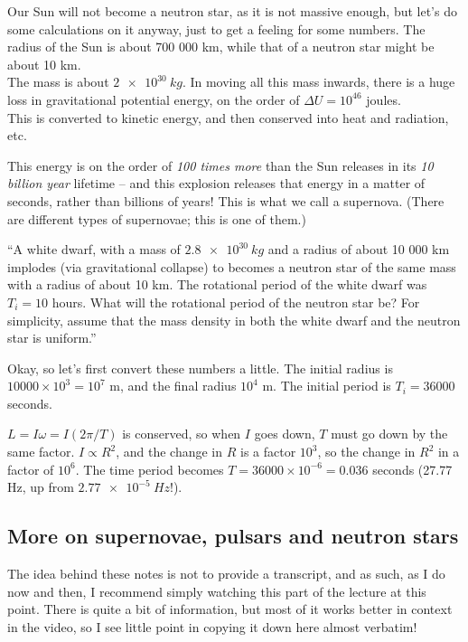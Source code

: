 Our Sun will not become a neutron star, as it is not massive enough, but let's do some calculations on it anyway, just to get a feeling for some numbers. The radius of the Sun is about 700 000 km, while that of a neutron star might be about 10 km.\\
The mass is about $\SI{2e30}{kg}$. In moving all this mass inwards, there is a huge loss in gravitational potential energy, on the order of $\Delta U = 10^{46}$ joules.\\
This is converted to kinetic energy, and then conserved into heat and radiation, etc.

This energy is on the order of \emph{100 times more} than the Sun releases in its \emph{10 billion year} lifetime -- and this explosion releases that energy in a matter of seconds, rather than billions of years! This is what we call a supernova. (There are different types of supernovae; this is one of them.)

``A white dwarf, with a mass of $\SI{2.8e30}{kg}$ and a radius of about 10 000 km implodes (via gravitational collapse) to becomes a neutron star of the same mass with a radius of about 10 km. The rotational period of the white dwarf was $T_i = 10$ hours. What will the rotational period of the neutron star be? For simplicity, assume that the mass density in both the white dwarf and the neutron star is uniform.''

Okay, so let's first convert these numbers a little. The initial radius is $10000\times10^3 = 10^7$ m, and the final radius $10^4$ m. The initial period is $T_i = 36000$ seconds.

$ L = I \omega = I (2 \pi/T)$ is conserved, so when $I$ goes down, $T$ must go down by the same factor. $I \propto R^2$, and the change in $R$ is a factor $10^3$, so the change in $R^2$ in a factor of $10^6$. The time period becomes $T = 36000 \times 10^{-6} = 0.036$ seconds (27.77 Hz, up from $\SI{2.77e-5}{Hz}$!).

\subsection{More on supernovae, pulsars and neutron stars}

The idea behind these notes is not to provide a transcript, and as such, as I do now and then, I recommend simply watching this part of the lecture at this point. There is quite a bit of information, but most of it works better in context in the video, so I see little point in copying it down here almost verbatim!


